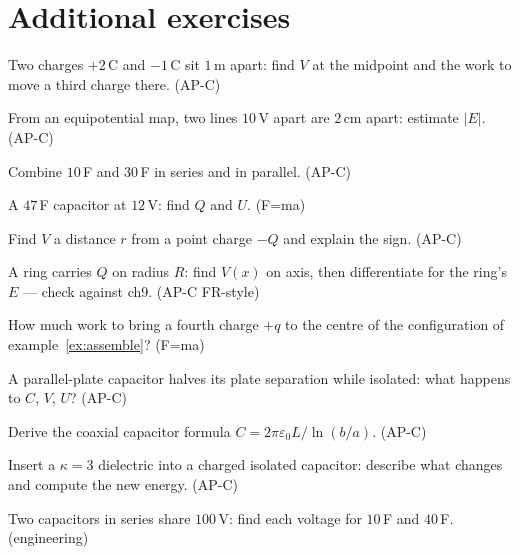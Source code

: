 \section*{Additional exercises}

\begin{exercise}[easy]
Two charges $+2$\,\textmu C and $-1$\,\textmu C sit $1$\,m apart:
find $V$ at the midpoint and the work to move a third charge there.
(AP-C)
\end{exercise}
\begin{exercise}[easy]
From an equipotential map, two lines $10$\,V apart are $2$\,cm apart:
estimate $|E|$. (AP-C)
\end{exercise}
\begin{exercise}[easy]
Combine $10$\,\textmu F and $30$\,\textmu F in series and in parallel.
(AP-C)
\end{exercise}
\begin{exercise}[easy]
A $47$\,\textmu F capacitor at $12$\,V: find $Q$ and $U$. (F=ma)
\end{exercise}
\begin{exercise}[easy]
Find $V$ a distance $r$ from a point charge $-Q$ and explain the sign.
(AP-C)
\end{exercise}
\begin{exercise}[medium]
A ring carries $Q$ on radius $R$: find $V(x)$ on axis, then
differentiate for the ring's $E$ --- check against ch9. (AP-C FR-style)
\end{exercise}
\begin{exercise}[medium]
How much work to bring a fourth charge $+q$ to the centre of the
configuration of example~\ref{ex:assemble}? (F=ma)
\end{exercise}
\begin{exercise}[medium]
A parallel-plate capacitor halves its plate separation while isolated:
what happens to $C$, $V$, $U$? (AP-C)
\end{exercise}
\begin{exercise}[medium]
Derive the coaxial capacitor formula $C=2\pi\varepsilon_0L/\ln(b/a)$.
(AP-C)
\end{exercise}
\begin{exercise}[medium]
Insert a $\kappa=3$ dielectric into a charged isolated capacitor:
describe what changes and compute the new energy. (AP-C)
\end{exercise}
\begin{exercise}[medium]
Two capacitors in series share $100$\,V: find each voltage for
$10$\,\textmu F and $40$\,\textmu F. (engineering)
\end{exercise}
